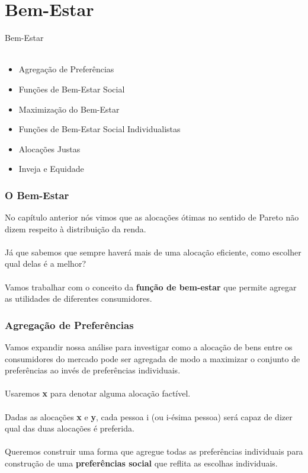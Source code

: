 \documentclass{beamer}[10]
\begin{document}
\section[Bem-Estar]{Bem-Estar}
\begin{frame}
	\huge Bem-Estar \normalsize
	\\~\\
	\begin{itemize}
		\item Agregação de Preferências
		\item Funções de Bem-Estar Social
		\item Maximização do Bem-Estar
		\item Funções de Bem-Estar Social Individualistas
		\item Alocações Justas
		\item Inveja e Equidade
	\end{itemize}
\end{frame}

\begin{frame}
	\frametitle{O Bem-Estar}

	No capítulo anterior nós vimos que as alocações ótimas no sentido de Pareto não dizem respeito à distribuição da renda.
	\\~\\
	Já que sabemos que sempre haverá mais de uma alocação eficiente, como escolher qual delas é a melhor?
	\\~\\
	Vamos trabalhar com o conceito da \textbf{função de bem-estar} que permite agregar as utilidades de diferentes consumidores.


\end{frame}

\begin{frame}
	\frametitle{Agregação de Preferências}

	Vamos expandir nossa análise para investigar como a alocação de bens entre os consumidores do mercado pode ser agregada de modo a maximizar o conjunto de preferências ao invés de preferências individuais.
	\\~\\
	Usaremos \textbf{x} para denotar alguma alocação factível.
	\\~\\
	Dadas as alocações \textbf{x} e \textbf{y}, cada pessoa i (ou i-ésima pessoa) será capaz de dizer qual das duas alocações é preferida.
	\\~\\
	Queremos construir uma forma que agregue todas as preferências individuais para construção de uma \textbf{preferências social} que reflita as escolhas individuais.

\end{frame}
\end{document}
